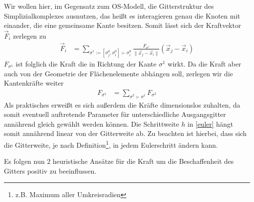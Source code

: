     Wir wollen hier, im Gegensatz zum OS-Modell, die Gitterstruktur des Simplizialkomplexes ausnutzen, das heißt es interagieren genau die Knoten mit einander, die eine gemeinsame Kante besitzen. Somit lässt sich der Kraftvektor \( \vec{F}_{i} \) zerlegen zu
  \begin{align}
    \vec{F}_{i} &= \sum_{\sigma^{1}:=[\sigma^{0}_{j}, \sigma^{0}_{i}]\succ\sigma^{0}_{i}} 
                                  \frac{F_{\sigma^{1}}}{\|\vec{x}_{j} - \vec{x}_{i}\|} \left(\vec{x}_{j} - \vec{x}_{i}\right)
  \end{align}
  \( F_{\sigma^{1}} \) ist folglich die Kraft die in Richtung der Kante \( \sigma^{1} \) wirkt. 
  Da die Kraft aber auch von der Geometrie der Flächenelemente abhängen soll, zerlegen wir die Kantenkräfte weiter
  \begin{align}
    F_{\sigma^{1}} &= \sum_{\sigma^{2}\succ\sigma^{1}} F_{\sigma^{2}}
  \end{align}
  Als praktisches erweißt es sich außerdem die Kräfte dimensionslos zuhalten, da somit eventuell auftretende Parameter für unterschiedliche
  Ausgangsgitter annährend gleich gewählt werden können. 
  Die Schrittweite \( h \) in \eqref{euler} hängt somit annährend linear von der Gitterweite ab. 
  Zu beachten ist hierbei, dass sich die Gitterweite, je nach Definition\footnote{z.B. Maximum aller Umkreisradien}, in jedem Eulerschritt ändern kann.

  Es folgen nun 2 heuristische Ansätze für die Kraft um die Beschaffenheit des Gitters positiv zu beeinflussen.

